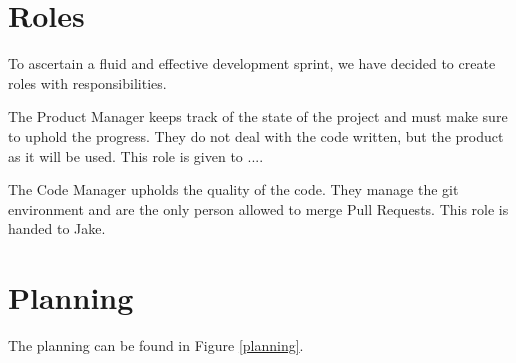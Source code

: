 \documentclass{jatex-article}
\begin{document}
\section*{Roles}

To ascertain a fluid and effective development sprint, we have decided to
create roles with responsibilities.

The Product Manager keeps track of the state of the project and must make sure
to uphold the progress. They do not deal with the code written, but the product
as it will be used. This role is given to ....

The Code Manager upholds the quality of the code. They manage the git
environment and are the only person allowed to merge Pull Requests. This role
is handed to Jake.

\section*{Planning}

The planning can be found in Figure \ref{planning}.
\end{document}
